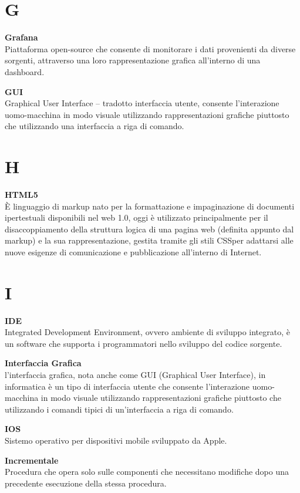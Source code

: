 \documentclass[a4paper, oneside, openany, dvipsnames, table, 12pt]{article}
\begin{document}
\newpage
\section{G}
\textbf{Grafana} \\
Piattaforma open-source che consente di monitorare i dati provenienti da diverse sorgenti, attraverso una loro rappresentazione grafica all'interno di una
dashboard.

\textbf{GUI} \\
Graphical User Interface – tradotto interfaccia utente, consente l’interazione uomo-macchina in modo visuale utilizzando rappresentazioni grafiche piuttosto che utilizzando una interfaccia a riga di comando.

\newpage
\section{H}
\textbf{HTML5}\\	
\`E linguaggio di markup nato per la formattazione e impaginazione di documenti ipertestuali disponibili nel web 1.0, oggi è utilizzato principalmente per il disaccoppiamento della struttura logica di una pagina web (definita appunto dal markup) e la sua rappresentazione, gestita tramite gli stili CSS\glo per adattarsi alle nuove esigenze di comunicazione e pubblicazione all'interno di Internet.

\newpage
\section{I}

\textbf{IDE} \\
Integrated Development Environment, ovvero ambiente di sviluppo integrato, è un software che supporta i programmatori nello sviluppo del codice sorgente. 

\textbf{Interfaccia Grafica} \\
l'interfaccia grafica, nota anche come GUI (Graphical User Interface), in informatica è un tipo di interfaccia utente che consente l'interazione uomo-macchina in modo visuale utilizzando rappresentazioni grafiche piuttosto che utilizzando i comandi tipici di un'interfaccia a riga di comando.

\textbf{IOS} \\
Sistemo operativo per dispositivi mobile sviluppato da Apple.

\textbf{Incrementale} \\
Procedura che opera solo sulle componenti che necessitano modifiche dopo una precedente esecuzione della stessa procedura.
\end{document}
